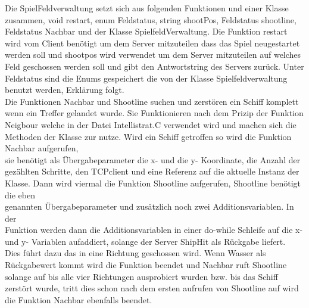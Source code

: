 Die SpielFeldverwaltung setzt sich aus folgenden Funktionen und einer Klasse\\ zusammen,
void restart, enum Feldstatus, string shootPos, Feldstatus shootline, \\Feldstatus Nachbar und der Klasse SpielfeldVerwaltung.
Die Funktion restart wird vom Client benötigt um dem Server mitzuteilen dass das Spiel neugestartet werden soll und shootpos wird verwendet um dem Server mitzuteilen auf welches Feld 
geschossen werden soll und gibt den Antwortstring des Servers zurück. Unter Feldstatus sind die Enums gespeichert die von der Klasse Spielfeldverwaltung benutzt werden, Erklärung 
folgt. \\Die Funktionen Nachbar und Shootline suchen und zerstören ein Schiff komplett wenn ein Treffer gelandet wurde. Sie Funktionieren nach dem Prizip der Funktion Neigbour welche 
in der Datei Intellistrat.C verwendet wird und machen sich die Methoden der Klasse zur nutze. Wird ein Schiff getroffen so wird die Funktion Nachbar aufgerufen, \\sie benötigt als 
Übergabeparameter die x- und die y- Koordinate, die Anzahl der \\gezählten Schritte, den TCPclient und eine Referenz auf die aktuelle Instanz der Klasse. Dann wird viermal die Funktion 
Shootline aufgerufen, Shootline benötigt die eben \\genannten Übergabeparameter und zusätzlich noch zwei Additionsvariablen. In der \\Funktion werden dann die Additionsvariablen in einer 
do-while Schleife auf die x- und y- Variablen aufaddiert, solange der Server ShipHit als Rückgabe liefert. \\Dies führt dazu das in eine Richtung geschossen wird. Wenn Wasser als 
Rückgabewert kommt wird die Funktion beendet und Nachbar ruft Shootline solange auf bis alle vier Richtungen ausprobiert wurden bzw. bis das Schiff zerstört wurde, tritt dies schon 
nach dem ersten aufrufen von Shootline auf wird die Funktion Nachbar ebenfalls beendet.

